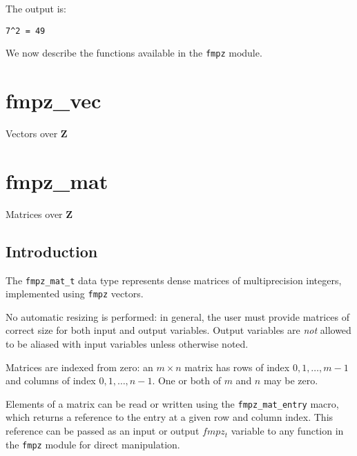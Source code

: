 \documentclass[a4paper,10pt]{book}
\newcommand{\Z}{\mathbf{Z}}%
\newcommand{\code}{\lstinline}
\begin{document}
The output is:
\begin{lstlisting}
7^2 = 49
\end{lstlisting}

We now describe the functions available in the \code{fmpz} module.




\chapter{fmpz\_vec}
\epigraph{Vectors over $\Z$}{}




\chapter{fmpz\_mat}
\epigraph{Matrices over $\Z$}{}

\section{Introduction}

The \code{fmpz_mat_t} data type represents dense matrices of multiprecision
integers, implemented using \code{fmpz} vectors.

No automatic resizing is performed: in general, the user must provide
matrices of correct size for both input and output variables. Output
variables are \emph{not} allowed to be aliased with input variables unless
otherwise noted.

Matrices are indexed from zero: an $m \times n$ matrix
has rows of index $0,1,\ldots,m-1$ and columns of
index $0,1,\ldots,n-1$. One or both of $m$ and $n$ may be zero.

Elements of a matrix can be read or written using the \code{fmpz_mat_entry}
macro, which returns a reference to the entry at a given row and column index.
This reference can be passed as an input or output $fmpz_t$ variable to any
function in the \code{fmpz} module for direct manipulation.
\end{document}
